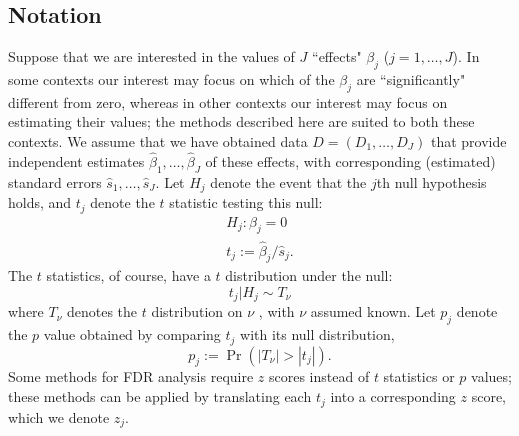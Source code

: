 \documentclass[11pt]{article}
\def\bhat{\hat{\beta}}
\def\shat{\hat{s}}
\begin{document}
 \subsection*{Notation}
 
Suppose that we are interested in the values of $J$ ``effects" $\beta_j$ ($j=1,\dots,J$). In some contexts our interest may focus on which of the $\beta_j$ are ``significantly" different from zero, whereas in other contexts our interest may focus on estimating their values; the methods described here are suited to both these contexts.
 We assume that we have obtained data $D=(D_1,\dots,D_J)$ that provide independent estimates $\bhat_1,\dots,\bhat_J$ of these effects,
 with corresponding (estimated) standard errors $\shat_1,\dots,\shat_J$. Let $H_j$ denote the event that the $j$th null hypothesis holds, and $t_j$ denote
 the $t$ statistic testing this null:
 \begin{gather}
 H_j: \beta_j = 0 \\  
 t_j :=\bhat_j/\shat_j. 
 \end{gather}
 The $t$ statistics, of course, have a $t$ distribution under the null:
 \begin{equation} \label{eqn:tstat}
 t_j | H_j \sim T_\nu
 \end{equation}
 where $T_\nu$ denotes the $t$ distribution on $\nu$ \df, with $\nu$ assumed known. 
 Let $p_j$ denote the $p$ value obtained by comparing $t_j$ with its null distribution,
 \begin{equation}
 p_j := \Pr(|T_\nu| > |t_j| ).
 \end{equation}
Some methods for FDR analysis require $z$ scores instead of $t$ statistics or $p$ values;
 these methods can be applied by translating each $t_j$ into a corresponding
$z$ score, which we denote $z_j$.


 
\end{document}

